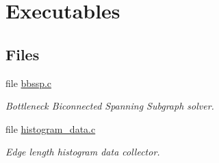 \hypertarget{group__bin}{
\section{Executables}
\label{group__bin}
}
\subsection*{Files}
\begin{CompactItemize}
\item 
file \hyperlink{bin_2bbssp_8c}{bbssp.c}
\begin{CompactList}\small\item\em Bottleneck Biconnected Spanning Subgraph solver. \item\end{CompactList}

\item 
file \hyperlink{histogram__data_8c}{histogram\_\-data.c}
\begin{CompactList}\small\item\em Edge length histogram data collector. \item\end{CompactList}

\end{CompactItemize}
